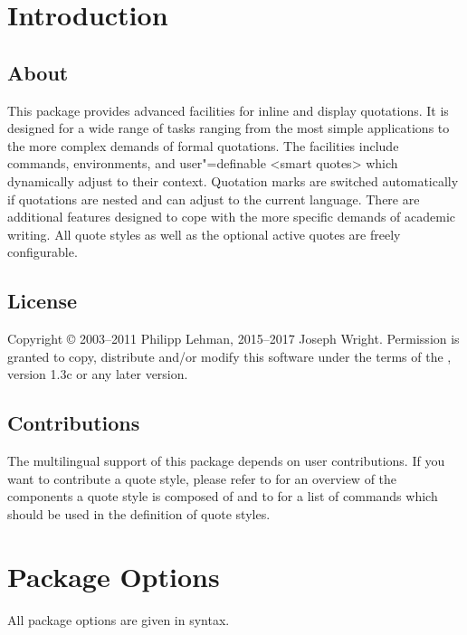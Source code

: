 \documentclass{ltxdockit}[2010/09/26]
\begin{document}
\printtitlepage
\tableofcontents
\listoftables

\section{Introduction}
\label{int}

\subsection[About]{About }

This package provides advanced facilities for inline and display quotations. It is designed for a wide range of tasks ranging from the most simple applications to the more complex demands of formal quotations. The facilities include commands, environments, and user"=definable <smart quotes> which dynamically adjust to their context. Quotation marks are switched automatically if quotations are nested and can adjust to the current language. There are additional features designed to cope with the more specific demands of academic writing. All quote styles as well as the optional active quotes are freely configurable.

\subsection{License}

Copyright © 2003--2011 Philipp Lehman, 2015--2017 Joseph Wright. Permission is granted to copy, distribute and\slash or modify this software under the terms of the \lppl, version 1.3c or any later version.

\subsection{Contributions}

The multilingual support of this package depends on user contributions. If you want to contribute a quote style, please refer to  for an overview of the components a quote style is composed of and to  for a list of commands which should be used in the definition of quote styles.

\section{Package Options}
\label{opt}

All package options are given in \keyval syntax.
\end{document}
